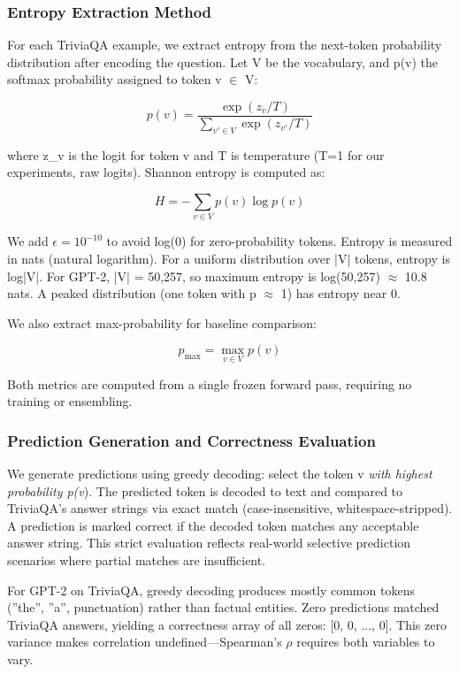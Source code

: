 \subsubsection{Entropy Extraction Method}

For each TriviaQA example, we extract entropy from the next-token probability distribution after encoding the question. Let V be the vocabulary, and p(v) the softmax probability assigned to token v $\in$ V:

$$p(v) = \frac{\exp(z_v / T)}{\sum_{v' \in V} \exp(z_{v'} / T)}$$

where z\_v is the logit for token v and T is temperature (T=1 for our experiments, raw logits). Shannon entropy is computed as:

$$H = -\sum_{v \in V} p(v) \log p(v)$$

We add $\epsilon = 10^{-10}$ to avoid log(0) for zero-probability tokens. Entropy is measured in nats (natural logarithm). For a uniform distribution over |V| tokens, entropy is log|V|. For GPT-2, |V| = 50,257, so maximum entropy is log(50,257) $\approx$ 10.8 nats. A peaked distribution (one token with p $\approx$ 1) has entropy near 0.

We also extract max-probability for baseline comparison:

$$p_{\max} = \max_{v \in V} p(v)$$

Both metrics are computed from a single frozen forward pass, requiring no training or ensembling.

\subsubsection{Prediction Generation and Correctness Evaluation}

We generate predictions using greedy decoding: select the token v\textit{ with highest probability p(v}). The predicted token is decoded to text and compared to TriviaQA's answer strings via exact match (case-insensitive, whitespace-stripped). A prediction is marked correct if the decoded token matches any acceptable answer string. This strict evaluation reflects real-world selective prediction scenarios where partial matches are insufficient.

For GPT-2 on TriviaQA, greedy decoding produces mostly common tokens (''the'', ''a'', punctuation) rather than factual entities. Zero predictions matched TriviaQA answers, yielding a correctness array of all zeros: [0, 0, ..., 0]. This zero variance makes correlation undefined---Spearman's $\rho$ requires both variables to vary.

